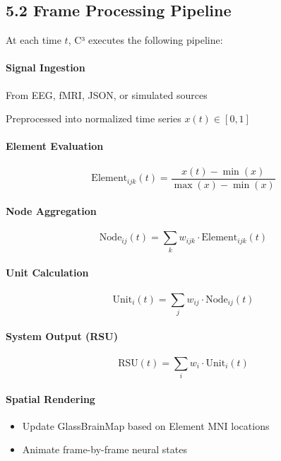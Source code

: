 \documentclass[10pt]{article}
\begin{document}
\subsection*{5.2 Frame Processing Pipeline}

At each time $t$, C³ executes the following pipeline:

\paragraph{Signal Ingestion}
From EEG, fMRI, JSON, or simulated sources

Preprocessed into normalized time series $x(t) \in [0, 1]$

\paragraph{Element Evaluation}

\[
\text{Element}_{ijk}(t) = \frac{x(t) - \min(x)}{\max(x) - \min(x)}
\]

\paragraph{Node Aggregation}

\[
\text{Node}_{ij}(t) = \sum_k w_{ijk} \cdot \text{Element}_{ijk}(t)
\]

\paragraph{Unit Calculation}

\[
\text{Unit}_i(t) = \sum_j w_{ij} \cdot \text{Node}_{ij}(t)
\]

\paragraph{System Output (RSU)}

\[
\text{RSU}(t) = \sum_i w_i \cdot \text{Unit}_i(t)
\]

\paragraph{Spatial Rendering}

\begin{itemize}
    \item Update GlassBrainMap based on Element MNI locations
    \item Animate frame-by-frame neural states
\end{itemize}
\end{document}
